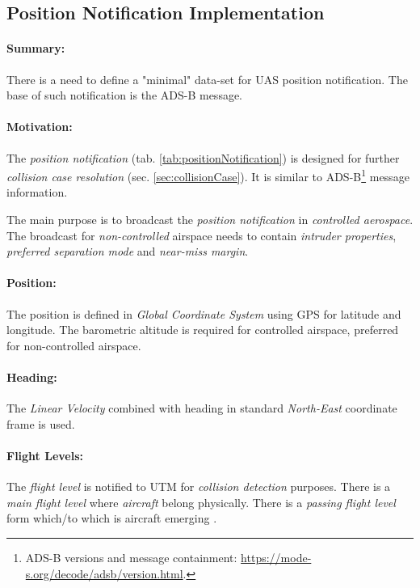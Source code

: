 \subsection{Position Notification Implementation}\label{sec:positionNotification}

\paragraph{Summary:} There is a need to define a "minimal" data-set for UAS position notification. The base of such notification is the ADS-B message.

\paragraph{Motivation:} The \emph{position notification} (tab. \ref{tab:positionNotification}) is designed for further \emph{collision case resolution} (sec. \ref{sec:collisionCase}). It is similar to ADS-B\footnote{ADS-B versions and message containment: \url{https://mode-s.org/decode/adsb/version.html}.} message information. 


The main purpose is to broadcast the \emph{position notification} in \emph{controlled aerospace}. The broadcast for \emph{non-controlled} airspace needs to contain \emph{intruder properties}, \emph{preferred separation mode} and \emph{near-miss margin}.

\paragraph{Position:} The position is defined in \emph{Global Coordinate System} using GPS for latitude and longitude. The barometric altitude is required for controlled airspace, preferred for non-controlled airspace.

\paragraph{Heading:} The \emph{Linear Velocity} combined with heading in standard \emph{North-East} coordinate frame is used.

\paragraph{Flight Levels:} The \emph{flight level} is notified to UTM for \emph{collision detection} purposes. There is a \emph{main flight level} where \emph{aircraft} belong physically. There is a \emph{passing flight level} form which/to which is aircraft emerging \cite{icao4444}. 

